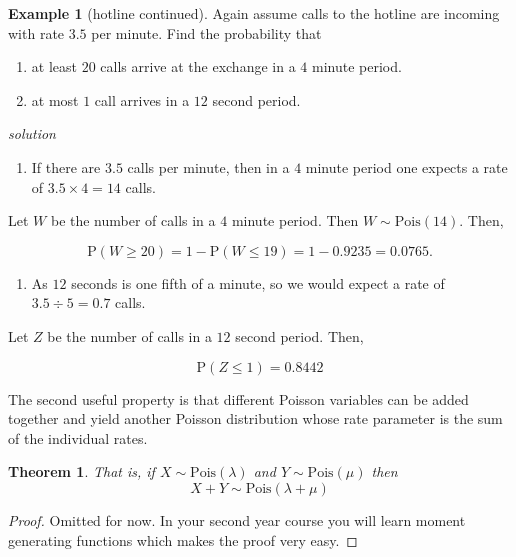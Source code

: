 \documentclass[
]{book}
\providecommand{\tightlist}{%
  \setlength{\itemsep}{0pt}\setlength{\parskip}{0pt}}
\newtheorem{theorem}{Theorem}[chapter]
\theoremstyle{definition}
\theoremstyle{definition}
\newtheorem{example}{Example}[chapter]
\theoremstyle{definition}
\theoremstyle{definition}
\theoremstyle{remark}
\begin{document}
\begin{example}[hotline continued]
Again assume calls to the hotline are incoming with rate \(3.5\) per minute. Find the probability that

\begin{enumerate}
\def\labelenumi{\alph{enumi})}
\item
  at least \(20\) calls arrive at the exchange in a \(4\) minute period.
\item
  at most \(1\) call arrives in a \(12\) second period.
\end{enumerate}

\emph{solution}

\begin{enumerate}
\def\labelenumi{\alph{enumi})}
\tightlist
\item
  If there are \(3.5\) calls per minute, then in a \(4\) minute period one expects a rate of \(3.5\times 4=14\) calls.
\end{enumerate}

Let \(W\) be the number of calls in a \(4\) minute period. Then \(W\sim\text{Pois}(14)\). Then,

\[\text{P}(W\geq 20) = 1- \text{P}(W\leq 19) = 1-0.9235 = 0.0765.\]

\begin{enumerate}
\def\labelenumi{\alph{enumi})}
\setcounter{enumi}{1}
\tightlist
\item
  As \(12\) seconds is one fifth of a minute, so we would expect a rate of \(3.5\div 5 = 0.7\) calls.
\end{enumerate}

Let \(Z\) be the number of calls in a \(12\) second period. Then,

\[\text{P}(Z\leq 1) = 0.8442\]
\end{example}

The second useful property is that different Poisson variables can be added together and yield another Poisson distribution whose rate parameter is the sum of the individual rates.

\begin{theorem}
That is, if \(X\sim \text{Pois}(\lambda)\) and \(Y\sim \text{Pois}(\mu)\) then
\[X+Y \sim \text{Pois}(\lambda+\mu)\]
\end{theorem}

\begin{proof}
Omitted for now. In your second year course you will learn moment generating functions which makes the proof very easy.
\end{proof}
\end{document}
